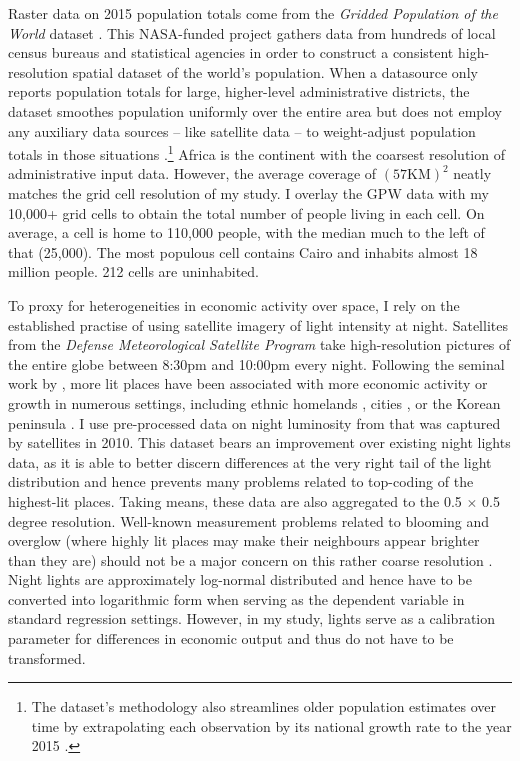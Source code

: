 \documentclass[11pt, oneside]{article}   	%
\begin{document}
Raster data on 2015 population totals come from the \textit{Gridded Population of the World} dataset \citep[GPW,][]{SocioeconomicDataandApplicationsCenter_GriddedPopulationWorld_2016}. This NASA-funded project gathers data from hundreds of local census bureaus and statistical agencies in order to construct a consistent high-resolution spatial dataset of the world's population. When a datasource only reports population totals for large, higher-level administrative districts, the dataset smoothes population uniformly over the entire area but does not employ any auxiliary data sources -- like satellite data -- to weight-adjust population totals in those situations \citep{Doxsey-Whitfield_TakingAdvantageImproved_2015}.\footnote{The dataset's methodology also streamlines older population estimates over time by extrapolating each observation by its national growth rate to the year 2015 \citep{Doxsey-Whitfield_TakingAdvantageImproved_2015}.} Africa is the continent with the coarsest resolution of administrative input data. However, the average coverage of $(57\textrm{KM})^{2}$ neatly matches the grid cell resolution of my study. I overlay the GPW data with my 10,000+ grid cells to obtain the total number of people living in each cell. On average, a cell is home to 110,000 people, with the median much to the left of that (25,000). The most populous cell contains Cairo and inhabits almost 18 million people. 212 cells are uninhabited.

To proxy for heterogeneities in economic activity over space, I rely on the established practise of using satellite imagery of light intensity at night. Satellites from the \textit{Defense Meteorological Satellite Program} take high-resolution pictures of the entire globe between 8:30pm and 10:00pm every night. Following the seminal work by \cite{Henderson_MeasuringEconomicGrowth_2012}, more lit places have been associated with more economic activity or growth in numerous settings, including ethnic homelands \citep{Michalopoulos_NationalInstitutionsSubnational_2014}, cities \citep{Storeygard_FartherRoadTransport_2016,Kocornik-Mina_Floodedcities_2015}, or the Korean peninsula \citep{Lee_InternationalIsolationRegional_2016}. I use pre-processed data on night luminosity from \cite{Henderson_GlobalSpatialDistribution_2018} that was captured by satellites in 2010. This dataset bears an improvement over existing night lights data, as it is able to better discern differences at the very right tail of the light distribution and hence prevents many problems related to top-coding of the highest-lit places. Taking means, these data are also aggregated to the 0.5 $\times$ 0.5 degree resolution. Well-known measurement problems related to blooming and overglow (where highly lit places may make their neighbours appear brighter than they are) should not be a major concern on this rather coarse resolution \citep{Michalopoulos_SpatialPatternsDevelopment_2018}. Night lights are approximately log-normal distributed and hence have to be converted into logarithmic form when serving as the dependent variable in standard regression settings. However, in my study, lights serve as a calibration parameter for differences in economic output and thus do not have to be transformed.
\end{document}
